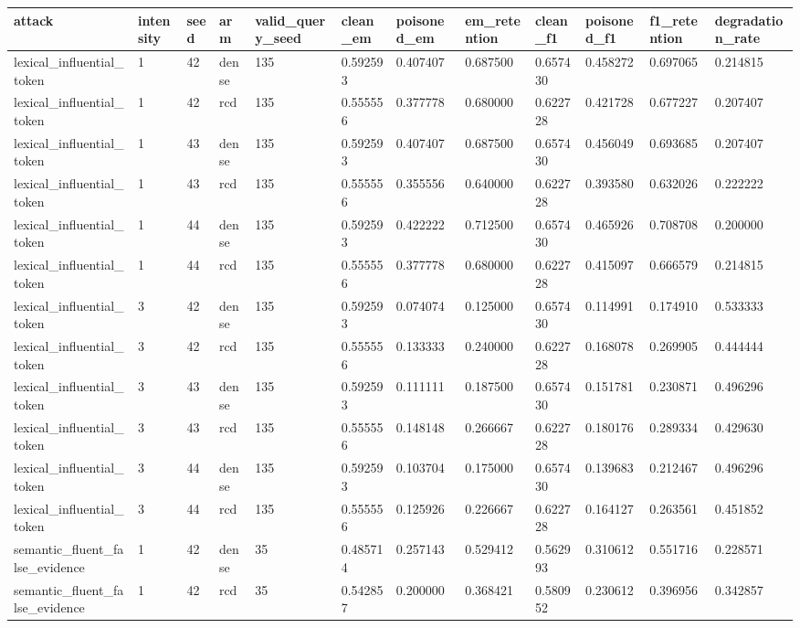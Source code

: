 \begin{tabular}{llllllllllll}
\toprule
attack & intensity & seed & arm & valid\_query\_seed & clean\_em & poisoned\_em & em\_retention & clean\_f1 & poisoned\_f1 & f1\_retention & degradation\_rate \\
\midrule
lexical\_influential\_token & 1 & 42 & dense & 135 & 0.592593 & 0.407407 & 0.687500 & 0.657430 & 0.458272 & 0.697065 & 0.214815 \\
lexical\_influential\_token & 1 & 42 & rcd & 135 & 0.555556 & 0.377778 & 0.680000 & 0.622728 & 0.421728 & 0.677227 & 0.207407 \\
lexical\_influential\_token & 1 & 43 & dense & 135 & 0.592593 & 0.407407 & 0.687500 & 0.657430 & 0.456049 & 0.693685 & 0.207407 \\
lexical\_influential\_token & 1 & 43 & rcd & 135 & 0.555556 & 0.355556 & 0.640000 & 0.622728 & 0.393580 & 0.632026 & 0.222222 \\
lexical\_influential\_token & 1 & 44 & dense & 135 & 0.592593 & 0.422222 & 0.712500 & 0.657430 & 0.465926 & 0.708708 & 0.200000 \\
lexical\_influential\_token & 1 & 44 & rcd & 135 & 0.555556 & 0.377778 & 0.680000 & 0.622728 & 0.415097 & 0.666579 & 0.214815 \\
lexical\_influential\_token & 3 & 42 & dense & 135 & 0.592593 & 0.074074 & 0.125000 & 0.657430 & 0.114991 & 0.174910 & 0.533333 \\
lexical\_influential\_token & 3 & 42 & rcd & 135 & 0.555556 & 0.133333 & 0.240000 & 0.622728 & 0.168078 & 0.269905 & 0.444444 \\
lexical\_influential\_token & 3 & 43 & dense & 135 & 0.592593 & 0.111111 & 0.187500 & 0.657430 & 0.151781 & 0.230871 & 0.496296 \\
lexical\_influential\_token & 3 & 43 & rcd & 135 & 0.555556 & 0.148148 & 0.266667 & 0.622728 & 0.180176 & 0.289334 & 0.429630 \\
lexical\_influential\_token & 3 & 44 & dense & 135 & 0.592593 & 0.103704 & 0.175000 & 0.657430 & 0.139683 & 0.212467 & 0.496296 \\
lexical\_influential\_token & 3 & 44 & rcd & 135 & 0.555556 & 0.125926 & 0.226667 & 0.622728 & 0.164127 & 0.263561 & 0.451852 \\
semantic\_fluent\_false\_evidence & 1 & 42 & dense & 35 & 0.485714 & 0.257143 & 0.529412 & 0.562993 & 0.310612 & 0.551716 & 0.228571 \\
semantic\_fluent\_false\_evidence & 1 & 42 & rcd & 35 & 0.542857 & 0.200000 & 0.368421 & 0.580952 & 0.230612 & 0.396956 & 0.342857 \\

\end{tabular}
